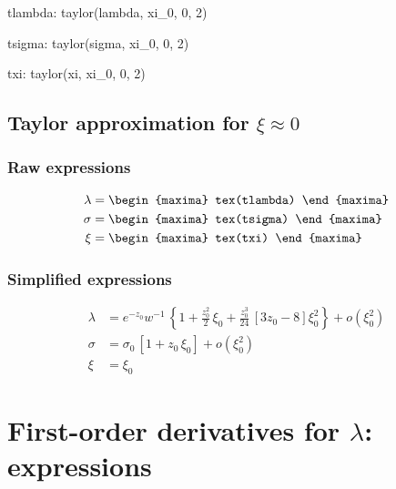 {\footnotesize
\begin{maxima}
  tlambda: taylor(lambda, xi_0, 0, 2)
\end{maxima}
\begin{maxima}
  tsigma: taylor(sigma, xi_0, 0, 2)
\end{maxima}
\begin{maxima}
  txi: taylor(xi, xi_0, 0, 2)
\end{maxima}
}

\subsection{Taylor approximation for $\xi \approx 0$}

\subsubsection*{Raw expressions}

{\footnotesize \color{MonVertF}
\begin{align*}
\lambda &= 
\begin{maxima}
  tex(tlambda)
\end{maxima} \\
\sigma &= 
\begin{maxima}
  tex(tsigma)
\end{maxima}\\
  \xi &= 
\begin{maxima}
  tex(txi)
\end{maxima}
\end{align*}
}

\subsubsection*{Simplified expressions}

{\color{red}
\begin{align*}
  \lambda &= e^{-z_0} w^{-1} \,  \left\{ 1 + \frac{z_0^2}{2} \, \xi_0 +
            \frac{z_0^3}{24}\, \left[ 3 z_0 - 8\right] \xi_0^2 \right\}
            + o(\xi_0^2)\\
  \sigma &= \sigma_0 \,  \left[ 1 + z_0 \, \xi_0  \right] + o(\xi_0^2)\\
  \xi &= \xi_0
\end{align*}
}



\section{First-order derivatives for $\lambda$: expressions}


